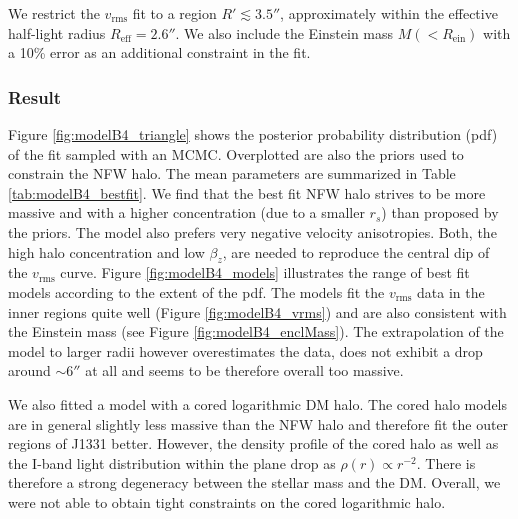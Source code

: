 \documentclass[useAMS,usenatbib]{mnras}
\begin{document}
We restrict the $v_\text{rms}$ fit to a region $R' \lesssim 3.5''$, approximately within the effective half-light radius $R_\text{eff} = 2.6''$. We also include the Einstein mass $M(<R_\text{ein})$ with a 10\% error as an additional constraint in the fit.


\subsubsection{Result} \label{sec:results_JAM_NFW_results}

Figure \ref{fig:modelB4_triangle} shows the posterior probability distribution (pdf) of the fit sampled with an MCMC. Overplotted are also the priors used to constrain the NFW halo. The mean parameters are summarized in Table \ref{tab:modelB4_bestfit}. We find that the best fit NFW halo strives to be more massive and with a higher concentration (due to a smaller $r_s$) than  proposed by the priors. The model also prefers  very negative velocity anisotropies. Both, the high halo concentration and low $\beta_z$, are needed to reproduce the central dip of the $v_\text{rms}$ curve. Figure \ref{fig:modelB4_models} illustrates the range of best fit models according to the extent of the pdf. The models fit the $v_\text{rms}$ data in the inner regions quite well (Figure \ref{fig:modelB4_vrms}) and are also consistent with the Einstein mass (see Figure \ref{fig:modelB4_enclMass}). The extrapolation of the model to larger radii however overestimates the data, does not exhibit a drop around $\sim 6''$ at all and seems to be therefore overall too massive.

We also fitted a model with a cored logarithmic DM halo. The cored halo models are in general slightly less massive than the NFW halo and therefore fit the outer regions of J1331 better. However, the density profile of the cored halo as well as the I-band light distribution within the plane drop as $\rho(r) \propto r^{-2}$. There is therefore a strong degeneracy between the stellar mass and the DM. Overall, we were not able to obtain tight constraints on the cored logarithmic halo.
\end{document}
